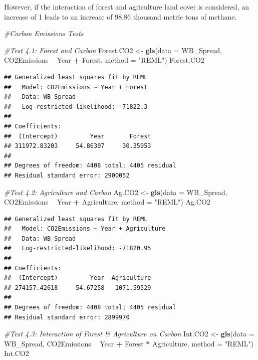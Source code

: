 \documentclass[12pt,]{article}
\newenvironment{Shaded}{\begin{snugshade}}{\end{snugshade}}
\newcommand{\KeywordTok}[1]{\textcolor[rgb]{0.13,0.29,0.53}{\textbf{#1}}}
\newcommand{\DataTypeTok}[1]{\textcolor[rgb]{0.13,0.29,0.53}{#1}}
\newcommand{\StringTok}[1]{\textcolor[rgb]{0.31,0.60,0.02}{#1}}
\newcommand{\CommentTok}[1]{\textcolor[rgb]{0.56,0.35,0.01}{\textit{#1}}}
\newcommand{\OperatorTok}[1]{\textcolor[rgb]{0.81,0.36,0.00}{\textbf{#1}}}
\newcommand{\NormalTok}[1]{#1}
\begin{document}
However, if the interaction of forest and agriculture land cover is
considered, an increase of 1 leads to an increase of 98.86 thousand
metric tons of methane.

\begin{Shaded}
\begin{Highlighting}[]
\CommentTok{#Carbon Emissions Tests }

\CommentTok{#Test 4.1: Forest and Carbon}
\NormalTok{Forest.CO2 <-}\StringTok{ }\KeywordTok{gls}\NormalTok{(}\DataTypeTok{data =}\NormalTok{ WB_Spread, }
\NormalTok{                  CO2Emissions }\OperatorTok{~}\StringTok{ }\NormalTok{Year }\OperatorTok{+}\StringTok{ }\NormalTok{Forest,}
                  \DataTypeTok{method =} \StringTok{"REML"}\NormalTok{)}
\NormalTok{Forest.CO2 }
\end{Highlighting}
\end{Shaded}

\begin{verbatim}
## Generalized least squares fit by REML
##   Model: CO2Emissions ~ Year + Forest 
##   Data: WB_Spread 
##   Log-restricted-likelihood: -71822.3
## 
## Coefficients:
##  (Intercept)         Year       Forest 
## 311972.83203     54.86307     30.35953 
## 
## Degrees of freedom: 4408 total; 4405 residual
## Residual standard error: 2900052
\end{verbatim}

\begin{Shaded}
\begin{Highlighting}[]
\CommentTok{#Test 4.2: Agriculture and Carbon }
\NormalTok{Ag.CO2 <-}\StringTok{ }\KeywordTok{gls}\NormalTok{(}\DataTypeTok{data =}\NormalTok{ WB_Spread,}
\NormalTok{                 CO2Emissions }\OperatorTok{~}\StringTok{ }\NormalTok{Year }\OperatorTok{+}\StringTok{ }\NormalTok{Agriculture,}
                 \DataTypeTok{method =} \StringTok{"REML"}\NormalTok{)}
\NormalTok{Ag.CO2 }
\end{Highlighting}
\end{Shaded}

\begin{verbatim}
## Generalized least squares fit by REML
##   Model: CO2Emissions ~ Year + Agriculture 
##   Data: WB_Spread 
##   Log-restricted-likelihood: -71820.95
## 
## Coefficients:
##  (Intercept)         Year  Agriculture 
## 274157.42618     54.67258   1071.59529 
## 
## Degrees of freedom: 4408 total; 4405 residual
## Residual standard error: 2899970
\end{verbatim}

\begin{Shaded}
\begin{Highlighting}[]
\CommentTok{#Test 4.3: Interaction of Forest & Agriculture on Carbon }
\NormalTok{Int.CO2 <-}\StringTok{ }\KeywordTok{gls}\NormalTok{(}\DataTypeTok{data =}\NormalTok{ WB_Spread,}
\NormalTok{                    CO2Emissions }\OperatorTok{~}\StringTok{ }\NormalTok{Year }\OperatorTok{+}\StringTok{ }\NormalTok{Forest }\OperatorTok{*}\StringTok{ }\NormalTok{Agriculture,}
                    \DataTypeTok{method =} \StringTok{"REML"}\NormalTok{)}
\NormalTok{Int.CO2 }
\end{Highlighting}
\end{Shaded}
\end{document}
